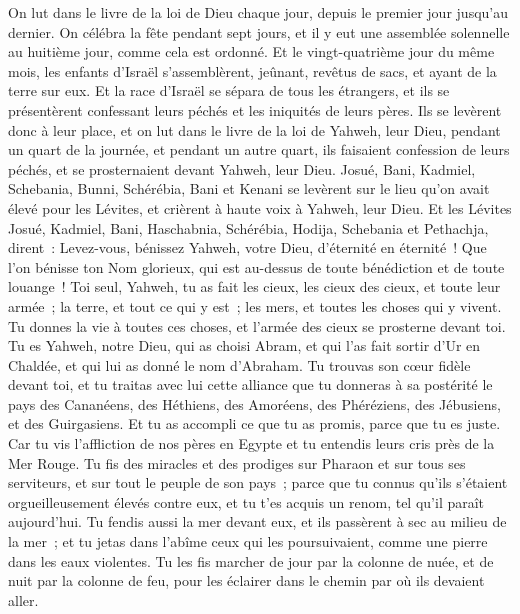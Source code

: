 \begin{multicols}{2}
On lut dans le livre de la loi de Dieu chaque jour, depuis le premier jour jusqu'au dernier. On célébra la fête pendant sept jours, et il y eut une assemblée solennelle au huitième jour, comme cela est ordonné.
\VerseOne{}Et le vingt-quatrième jour du même mois, les enfants d'Israël s'assemblèrent, jeûnant, revêtus de sacs, et ayant de la terre sur eux.
Et la race d'Israël se sépara de tous les étrangers, et ils se présentèrent confessant leurs péchés et les iniquités de leurs pères.
Ils se levèrent donc à leur place, et on lut dans le livre de la loi de Yahweh, leur Dieu, pendant un quart de la journée, et pendant un autre quart, ils faisaient confession de leurs péchés, et se prosternaient devant Yahweh, leur Dieu.
Josué, Bani, Kadmiel, Schebania, Bunni, Schérébia, Bani et Kenani se levèrent sur le lieu qu'on avait élevé pour les Lévites, et crièrent à haute voix à Yahweh, leur Dieu.
Et les Lévites Josué, Kadmiel, Bani, Haschabnia, Schérébia, Hodija, Schebania et Pethachja, dirent~: Levez-vous, bénissez Yahweh, votre Dieu, d'éternité en éternité~! Que l'on bénisse ton Nom glorieux, qui est au-dessus de toute bénédiction et de toute louange~!
Toi seul, Yahweh, tu as fait les cieux, les cieux des cieux, et toute leur armée~; la terre, et tout ce qui y est~; les mers, et toutes les choses qui y vivent. Tu donnes la vie à toutes ces choses, et l'armée des cieux se prosterne devant toi.
Tu es Yahweh, notre Dieu, qui as choisi Abram, et qui l'as fait sortir d'Ur en Chaldée, et qui lui as donné le nom d'Abraham.
Tu trouvas son cœur fidèle devant toi, et tu traitas avec lui cette alliance que tu donneras à sa postérité le pays des Cananéens, des Héthiens, des Amoréens, des Phéréziens, des Jébusiens, et des Guirgasiens. Et tu as accompli ce que tu as promis, parce que tu es juste.
Car tu vis l'affliction de nos pères en Egypte et tu entendis leurs cris près de la Mer Rouge.
Tu fis des miracles et des prodiges sur Pharaon et sur tous ses serviteurs, et sur tout le peuple de son pays~; parce que tu connus qu'ils s'étaient orgueilleusement élevés contre eux, et tu t'es acquis un renom, tel qu'il paraît aujourd'hui.
Tu fendis aussi la mer devant eux, et ils passèrent à sec au milieu de la mer~; et tu jetas dans l'abîme ceux qui les poursuivaient, comme une pierre dans les eaux violentes.
Tu les fis marcher de jour par la colonne de nuée, et de nuit par la colonne de feu, pour les éclairer dans le chemin par où ils devaient aller.

\end{multicols}

